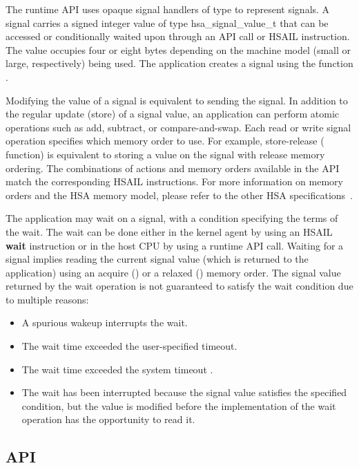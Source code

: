 \documentclass[final,oneside]{book}
\newcommand{\reffun}[1]{\textbf{#1}}
\newcommand{\reftyp}[1]{#1}
\newcommand{\refhsl}[1]{\reffun{#1}}
\begin{document}
The runtime API uses opaque signal handlers of type  to
represent signals. A signal carries a signed integer value of type
\reftyp{hsa_signal_value_t} that can be accessed or conditionally waited upon
through an API call or HSAIL instruction. The value occupies four or eight bytes
depending on the machine model (small or large, respectively) being used. The
application creates a signal using the function .

Modifying the value of a signal is equivalent to sending the signal. In addition
to the regular update (store) of a signal value, an application can perform
atomic operations such as add, subtract, or compare-and-swap. Each read or write
signal operation specifies which memory order to use. For example, store-release
( function) is equivalent to storing a value on
the signal with release memory ordering. The combinations of actions and
memory orders available in the API match the corresponding HSAIL
instructions. For more information on memory orders and the HSA memory model,
please refer to the other HSA specifications~\cite{prm, sar}.

The application may wait on a signal, with a condition specifying the terms of
the wait. The wait can be done either in the kernel agent by using an HSAIL
\refhsl{wait} instruction or in the host CPU by using a runtime API
call. Waiting for a signal implies reading the current signal value (which is
returned to the application) using an acquire ()
or a relaxed () memory order. The signal value
returned by the wait operation is not guaranteed to satisfy the wait condition
due to multiple reasons:
\begin{itemize}[itemsep=1pt,topsep=3pt,partopsep=0pt]
\item A spurious wakeup interrupts the wait.
\item The wait time exceeded the user-specified timeout.
\item The wait time exceeded the system timeout
  .
\item The wait has been interrupted because the signal value satisfies the
  specified condition, but the value is modified before the implementation of
  the wait operation has the opportunity to read it.
\end{itemize}


\subsection{API}
\end{document}
